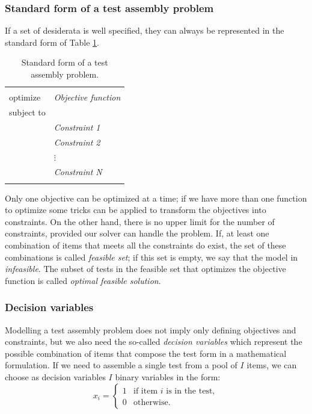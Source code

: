 \subsubsection{Standard form of a test assembly problem}

If a set of desiderata is well specified, they can always be represented in the standard form of Table \ref{tab:stform}.

\begin{table}
	\centering
	\begin{tabular}{|ll|}
		\hline    & \\
		optimize & \textit{Objective function} \\
		subject to & \\
		& \textit{Constraint 1} \\
		& \textit{Constraint 2} \\
		& $\vdots$ \\
		& \textit{Constraint N} \\
		& \\
		\hline
	\end{tabular}
	\caption{Standard form of a test assembly problem.}\label{tab:stform}
\end{table}

Only one objective can be optimized at a time; if we have more than one function to optimize some tricks can be applied to transform the objectives into constraints. On the other hand, there is no upper limit for the number of constraints, provided our solver can handle the problem.
If, at least one combination of items that meets all the constraints do exist, the set of these combinations is called \emph{feasible set}; if this set is empty, we say that the model in \emph{infeasible}.
The subset of tests in the feasible set that optimizes the objective function is called \emph{optimal feasible solution}.

\subsubsection{Decision variables}

Modelling a test assembly problem does not imply only defining objectives and constraints, but we also need the so-called \emph{decision variables} which represent the possible combination of items that compose the test form in a mathematical formulation.
If we need to assemble a single test from a pool of $I$ items, we can choose as decision variables $I$ binary variables in the form:
\begin{equation*}\label{eq:Mmod:Mol}
x_{i}=
\begin{cases}
1 & \mbox{if item }i \mbox{ is in the test},\\
0 & \mbox{otherwise}.
\end{cases}
\end{equation*}

